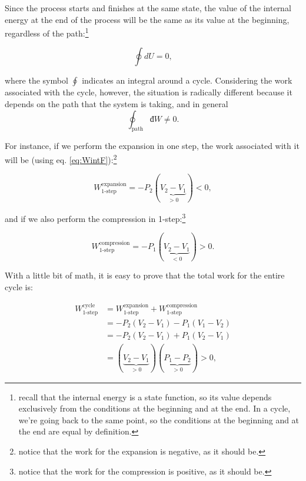 \documentclass[
]{book}
\theoremstyle{definition}
\theoremstyle{definition}
\theoremstyle{definition}
\theoremstyle{remark}
\begin{document}
Since the process starts and finishes at the same state, the value of the internal energy at the end of the process will be the same as its value at the beginning, regardless of the path:\footnote{recall that the internal energy is a state function, so its value depends exclusively from the conditions at the beginning and at the end. In a cycle, we're going back to the same point, so the conditions at the beginning and at the end are equal by definition.}

\begin{equation}
  \oint dU=0,
  \label{eq:de0}
\end{equation}

where the symbol \(\oint\) indicates an integral around a cycle. Considering the work associated with the cycle, however, the situation is radically different because it depends on the path that the system is taking, and in general
\begin{equation}
\oint_{\text{path}} đW \neq 0.
  \label{eq:dw0}
\end{equation}

For instance, if we perform the expansion in one step, the work associated with it will be (using eq. \eqref{eq:WintF}):\footnote{notice that the work for the expansion is negative, as it should be.}

\begin{equation}
  W^{\text{expansion}}_{\text{1-step}}=-P_2(\underbrace{V_2-V_1}_{>0})<0,
  \label{eq:Wexp1}
\end{equation}

and if we also perform the compression in 1-step:\footnote{notice that the work for the compression is positive, as it should be.}

\begin{equation}
  W^{\text{compression}}_{\text{1-step}}=-P_1(\underbrace{V_2-V_1}_{<0})>0.
  \label{eq:Wcomp1}
\end{equation}

With a little bit of math, it is easy to prove that the total work for the entire cycle is:

\begin{equation}
\begin{aligned}
W^{\text{cycle}}_{\text{1-step}} {} & =  W^{\text{expansion}}_{\text{1-step}}+W^{\text{compression}}_{\text{1-step}} \\
 & = -P_2(V_2-V_1)-P_1(V_1-V_2) \\
 & = -P_2(V_2-V_1)+P_1(V_2-V_1) \\
 & = (\underbrace{V_2-V_1}_{>0})(\underbrace{P_1-P_2}_{>0}) > 0,
\end{aligned}
  \label{eq:Wtot1}
\end{equation}
\end{document}
